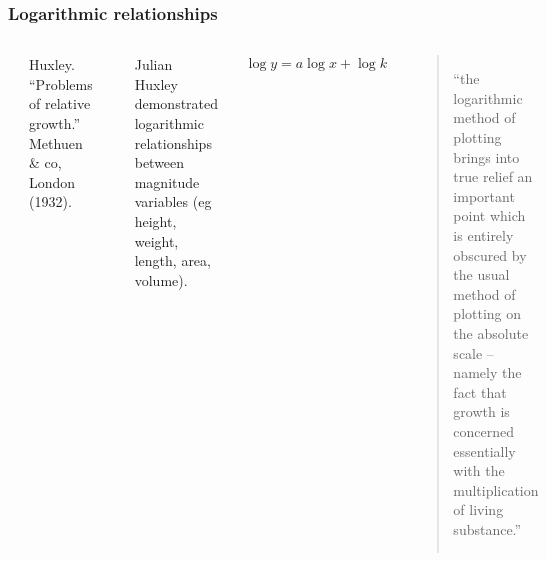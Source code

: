 
\begin{frame}
\frametitle{Logarithmic relationships}
\begin{columns}[c]
\includegraphics[width=\textwidth]{huxley}\par
\begin{tiny}
Huxley. ``Problems of relative growth.'' Methuen \& co, London (1932).
\end{tiny}
\includegraphics[width=\textwidth]{baboon_skulls}\par
{}
Julian Huxley demonstrated logarithmic relationships between magnitude variables (eg height, weight, length, area, volume).\par
\begin{Large}
\begin{align*}
\log y = a \log x + \log k
\end{align*}
\end{Large}
\begin{quote}
``the logarithmic method
of plotting brings into true relief an important point which
is entirely obscured by the usual method of plotting on the
absolute scale -- namely the fact that growth is concerned
essentially with the multiplication of living substance.''
\end{quote}
\end{columns}
\end{frame}


